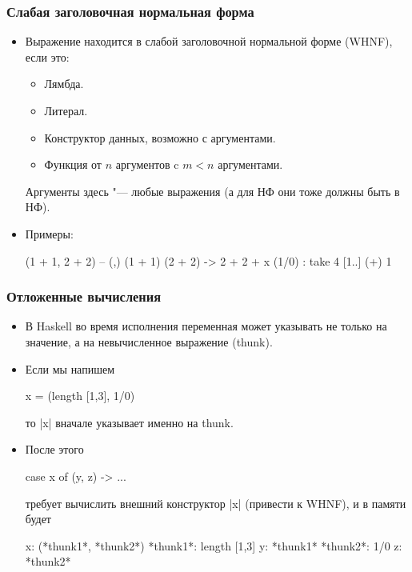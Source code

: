 \documentclass[11pt]{beamer}
\begin{document}
\begin{frame}[fragile]
  \frametitle{Слабая заголовочная нормальная форма}
  \begin{itemize}
    \item Выражение находится в слабой заголовочной нормальной форме (WHNF), если это:
          \begin{itemize}
            \item Лямбда.
            \item Литерал.
            \item Конструктор данных, возможно с аргументами.
            \item Функция от $n$ аргументов c $m<n$ аргументами.
          \end{itemize}
          Аргументы здесь "--- любые выражения \pause
          (а для НФ они тоже должны быть в НФ).
    \item Примеры: \pause
          \begin{haskell}
            (1 + 1, 2 + 2)       -- (,) (1 + 1) (2 + 2)
            \x -> 2 + 2 + x
            (1/0) : take 4 [1..]
            (+) 1
          \end{haskell}
  \end{itemize}
\end{frame}

\begin{frame}[fragile]
  \frametitle{Отложенные вычисления}
  \begin{itemize}
    \item В Haskell во время исполнения переменная может указывать не только на значение, а на невычисленное выражение (thunk).
    \item Если мы напишем
          \begin{haskell}
            x = (length [1,3], 1/0)
          \end{haskell}
          то \haskinline|x| вначале указывает именно на thunk.
    \item После этого
          \begin{haskell}
            case x of
              (y, z) -> ...
          \end{haskell}
          требует вычислить внешний конструктор \haskinline|x| (привести к WHNF), и в памяти будет \pause
          \begin{haskell}
            x: (*thunk1*, *thunk2*)  *thunk1*: length [1,3]
            y: *thunk1*              *thunk2*: 1/0
            z: *thunk2*
          \end{haskell}

  \end{itemize}
\end{frame}
\end{document}

